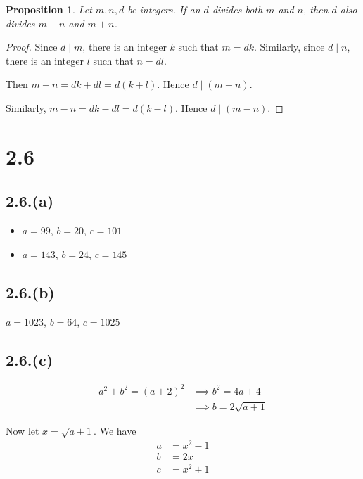 \documentclass[letterpaper, 12pt]{memoir}
\theoremstyle{mystyle}
\newtheorem*{prop}{Proposition}
\begin{document}
\begin{prop}
    Let $m,n, d$ be integers. If an $d$ divides both $m$ and $n$, then $d$ also
    divides $m-n$ and $m+n$.
\end{prop}

\begin{proof}
    Since $d \mid m$, there is an integer $k$ such that $m = dk$. Similarly,
    since $d \mid n$, there is an integer $l$ such that $n = dl$.
    
    Then $m+n = dk+dl = d(k+l)$. Hence $d \mid (m+n)$.
    
    Similarly, $m-n = dk-dl = d(k-l)$. Hence $d \mid (m-n)$.
\end{proof}


\section*{2.6}

\subsection*{2.6.(a)}
\begin{itemize}
  \item $a=99$, $b=20$, $c=101$
  \item $a=143$, $b=24$, $c=145$
\end{itemize}

\subsection*{2.6.(b)}
    $a=1023$, $b=64$, $c=1025$
    
\subsection*{2.6.(c)}
\begin{align*}
    a^2 + b^2 = (a+2)^2 &\implies b^2 = 4a + 4  \\
                    &\implies b = 2 \sqrt{a+1}
\end{align*}

Now let $x = \sqrt{a+1}$. We have
\begin{align*}
    a &= x^2 - 1 \\
    b &= 2x \\
    c &= x^2 + 1   
\end{align*}
\end{document}
